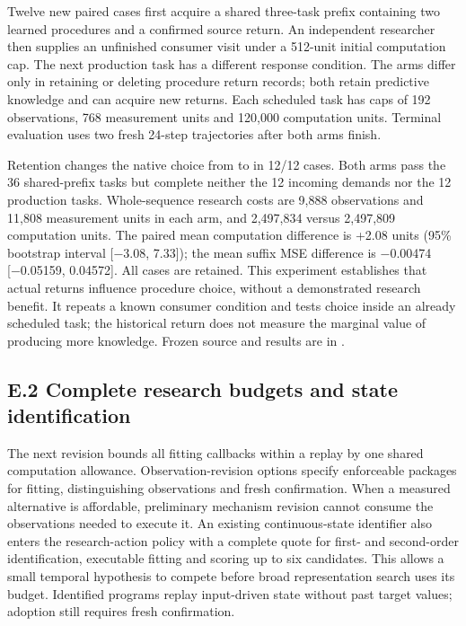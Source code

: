 \documentclass[twoside,11pt]{article}
\begin{document}
Twelve new paired cases first acquire a shared three-task prefix containing two
learned procedures and a confirmed source return. An independent researcher then
supplies an unfinished consumer visit under a 512-unit initial computation cap.
The next production task has a different response condition. The arms differ
only in retaining or deleting procedure return records; both retain predictive
knowledge and can acquire new returns. Each scheduled task has caps of 192
observations, 768 measurement units and 120,000 computation units. Terminal
evaluation uses two fresh 24-step trajectories after both arms finish.


Retention changes the native choice from  to  in 12/12 cases.
Both arms pass the 36 shared-prefix tasks but complete neither the 12 incoming
demands nor the 12 production tasks. Whole-sequence research costs are 9,888
observations and 11,808 measurement units in each arm, and 2,497,834 versus
2,497,809 computation units. The paired mean computation difference is +2.08
units (95\% bootstrap interval [−3.08, 7.33]); the mean suffix MSE difference is
−0.00474 [−0.05159, 0.04572]. All cases are retained. This experiment establishes
that actual returns influence procedure choice, without a demonstrated research
benefit. It repeats a known consumer condition and tests choice inside an already
scheduled task; the historical return does not measure the marginal value of
producing more knowledge. Frozen source and results are in
.


\subsection*{E.2 Complete research budgets and state identification}

The next revision bounds all fitting callbacks within a replay by one shared
computation allowance. Observation-revision options specify enforceable packages
for fitting, distinguishing observations and fresh confirmation. When a measured
alternative is affordable, preliminary mechanism revision cannot consume the
observations needed to execute it. An existing continuous-state identifier also
enters the research-action policy with a complete quote for first- and second-order
identification, executable fitting and scoring up to six candidates. This allows
a small temporal hypothesis to compete before broad representation search uses
its budget. Identified programs replay input-driven state without past target
values; adoption still requires fresh confirmation.
\end{document}
